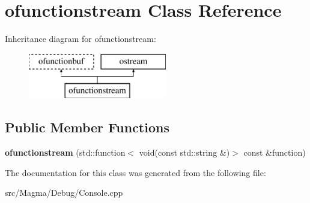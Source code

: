 \hypertarget{classofunctionstream}{}\section{ofunctionstream Class Reference}
\label{classofunctionstream}
Inheritance diagram for ofunctionstream\+:\begin{figure}[H]
\begin{center}
\leavevmode
\includegraphics[height=2.000000cm]{classofunctionstream}
\end{center}
\end{figure}
\subsection*{Public Member Functions}
\begin{DoxyCompactItemize}
\item 
\mbox{\label{classofunctionstream_a155ec3c7c07fe88d9bd0fe6beb20718f}} 
{\bfseries ofunctionstream} (std\+::function$<$ void(const std\+::string \&)$>$ const \&function)
\end{DoxyCompactItemize}


The documentation for this class was generated from the following file\+:\begin{DoxyCompactItemize}
\item 
src/\+Magma/\+Debug/Console.\+cpp\end{DoxyCompactItemize}
